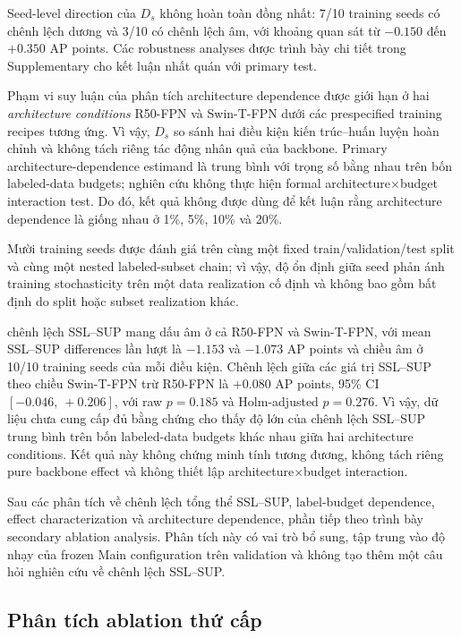 \documentclass[pdflatex,sn-mathphys-num]{sn-jnl}%
\theoremstyle{thmstyleone}%
\theoremstyle{thmstyletwo}%
\theoremstyle{thmstylethree}%
\begin{document}
Seed-level direction của $D_s$ không hoàn toàn đồng nhất: 7/10 training seeds có chênh lệch dương và 3/10 có chênh lệch âm, với khoảng quan sát từ $-0.150$ đến $+0.350$ AP points. Các robustness analyses được trình bày chi tiết trong Supplementary cho kết luận nhất quán với primary test.

Phạm vi suy luận của phân tích architecture dependence được giới hạn ở hai \textit{architecture conditions} R50-FPN và Swin-T-FPN dưới các prespecified training recipes tương ứng. Vì vậy, $D_s$ so sánh hai điều kiện kiến trúc--huấn luyện hoàn chỉnh và không tách riêng tác động nhân quả của backbone. Primary architecture-dependence estimand là trung bình với trọng số bằng nhau trên bốn labeled-data budgets; nghiên cứu không thực hiện formal architecture$\times$budget interaction test. Do đó, kết quả không được dùng để kết luận rằng architecture dependence là giống nhau ở 1\%, 5\%, 10\% và 20\%.

Mười training seeds được đánh giá trên cùng một fixed train/validation/test split và cùng một nested labeled-subset chain; vì vậy, độ ổn định giữa seed phản ánh training stochasticity trên một data realization cố định và không bao gồm bất định do split hoặc subset realization khác.

chênh lệch SSL--SUP mang dấu âm ở cả R50-FPN và Swin-T-FPN, với mean SSL--SUP differences lần lượt là $-1.153$ và $-1.073$ AP points và chiều âm ở 10/10 training seeds của mỗi điều kiện. Chênh lệch giữa các giá trị SSL--SUP theo chiều Swin-T-FPN trừ R50-FPN là $+0.080$ AP points, 95\% CI $[-0.046,\ +0.206]$, với raw $p=0.185$ và Holm-adjusted $p=0.276$. Vì vậy, dữ liệu chưa cung cấp đủ bằng chứng cho thấy độ lớn của chênh lệch SSL--SUP trung bình trên bốn labeled-data budgets khác nhau giữa hai architecture conditions. Kết quả này không chứng minh tính tương đương, không tách riêng pure backbone effect và không thiết lập architecture$\times$budget interaction.

Sau các phân tích về chênh lệch tổng thể SSL--SUP, label-budget dependence, effect
characterization và architecture dependence, phần tiếp theo trình bày
secondary ablation analysis. Phân tích này có vai trò bổ sung, tập trung vào
độ nhạy của frozen Main configuration trên validation và không tạo thêm một
câu hỏi nghiên cứu về chênh lệch SSL--SUP.

\subsection{Phân tích ablation thứ cấp}
\label{sec:results_ablation}
\end{document}
